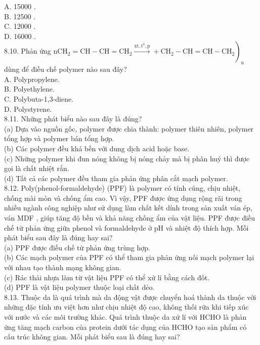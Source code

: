 \documentclass[10pt]{article}
\begin{document}
A. 15000 .\\
B. 12500 .\\
C. 12000 .\\
D. 16000 .\\
8.10. Phản ứng $\left.\mathrm{nCH}_{2}=\mathrm{CH}-\mathrm{CH}=\mathrm{CH}_{2} \xrightarrow{\mathrm{xt}, \mathrm{t}^{\mathrm{a}}, \mathrm{p}}+\mathrm{CH}_{2}-\mathrm{CH}=\mathrm{CH}-\mathrm{CH}_{2}\right)_{\mathrm{n}}$ dùng để điều chế polymer nào sau đây?\\
A. Polypropylene.\\
B. Polyethylene.\\
C. Polybuta-1,3-diene.\\
D. Polystyrene.\\
8.11. Những phát biểu nào sau đây là đúng?\\
(a) Dựa vào nguồn gốc, polymer được chia thành: polymer thiên nhiên, polymer tổng hợp và polymer bán tổng hợp.\\
(b) Các polymer đều khá bền với dung dịch acid hoặc base.\\
(c) Những polymer khi đun nóng không bị nóng chảy mà bị phân huỷ thì được gọi là chất nhiệt rắn.\\
(d) Tất cả các polymer đều tham gia phản ứng phân cắt mạch polymer.\\
8.12. Poly(phenol-formaldehyde) (PPF) là polymer có tính cúng, chịu nhiệt, chống mài mòn và chống ẩm cao. Vì vậy, PPF được ứng dụng rộng rãi trong nhiều ngành công nghiệp như sử dụng làm chất kết dính trong sản xuất ván ép, ván MDF , giúp tăng độ bền và khả năng chống ẩm của vật liệu. PPF được điều chế từ phản ứng giữa phenol và formaldehyde ở pH và nhiệt độ thích hợp. Mỗi phát biểu sau đây là đúng hay sai?\\
(a) PPF được điều chế từ phản ứng trùng hợp.\\
(b) Các mạch polymer của PPF có thể tham gia phản ứng nối mạch polymer lại với nhau tạo thành mạng không gian.\\
(c) Rác thải nhựa làm từ vật liệu PPF có thể xử lí bằng cách đốt.\\
(d) PPF là vật liệu polymer thuộc loại chất dẻo.\\
8.13. Thuộc da là quá trình mà da động vật được chuyển hoá thành da thuộc với những đặc tính ưu việt hơn như chịu nhiệt độ cao, không thối rữa khi tiếp xúc với nước và các môi trường khác. Quá trình thuộc da xử lí với HCHO là phản ứng tăng mạch carbon của protein dưới tác dụng của HCHO tạo sản phẩm có cấu trúc không gian. Mỗi phát biểu sau là đúng hay sai?\\
\end{document}
